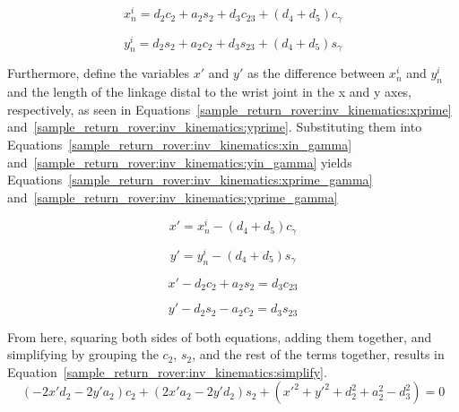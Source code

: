 \begin{equation}\label{sample_return_rover:inv_kinematics:xin_gamma}
	x^{i}_{n} = d_{2}c_{2}+a_{2}s_{2}+d_{3}c_{23}+(d_{4}+d_{5})c_{\gamma}
\end{equation}

\begin{equation}\label{sample_return_rover:inv_kinematics:yin_gamma}
	y^{i}_{n} = d_{2}s_{2}+a_{2}c_{2}+d_{3}s_{23}+(d_{4}+d_{5})s_{\gamma}
\end{equation}

Furthermore, define the variables $x'$ and $y'$ as the difference between $x^{i}_{n}$ and $y^{i}_{n}$ and the length of the linkage distal to the wrist joint in the x and y axes, respectively, as seen in Equations~\ref{sample_return_rover:inv_kinematics:xprime} and~\ref{sample_return_rover:inv_kinematics:yprime}. Substituting them into Equations~\ref{sample_return_rover:inv_kinematics:xin_gamma} and~\ref{sample_return_rover:inv_kinematics:yin_gamma} yields Equations~\ref{sample_return_rover:inv_kinematics:xprime_gamma} and~\ref{sample_return_rover:inv_kinematics:yprime_gamma}

\begin{equation}\label{sample_return_rover:inv_kinematics:xprime}
	x' = x^{i}_{n} -(d_{4}+d_{5})c_{\gamma}
\end{equation}

\begin{equation}\label{sample_return_rover:inv_kinematics:yprime}
	y' = y^{i}_{n} -(d_{4}+d_{5})s_{\gamma}
\end{equation}

\begin{equation}\label{sample_return_rover:inv_kinematics:xprime_gamma}
	x' - d_{2}c_{2} + a_{2}s_{2} = d_{3}c_{23}
\end{equation}

\begin{equation}\label{sample_return_rover:inv_kinematics:yprime_gamma}
	y' - d_{2}s_{2} - a_{2}c_{2} = d_{3}s_{23}
\end{equation}

From here, squaring both sides of both equations, adding them together, and simplifying by grouping the $c_{2}$, $s_{2}$, and the rest of the terms together, results in Equation~\ref{sample_return_rover:inv_kinematics:simplify}.
\begin{equation}\label{sample_return_rover:inv_kinematics:simplify}
	(-2x'd_{2} - 2y'a_{2})c_{2} + (2x'a_{2} - 2y'd_{2})s_{2} + (x'^{2} + y'^{2} + d_{2}^{2} + a_{2}^{2} - d_{3}^{2}) = 0
\end{equation}

